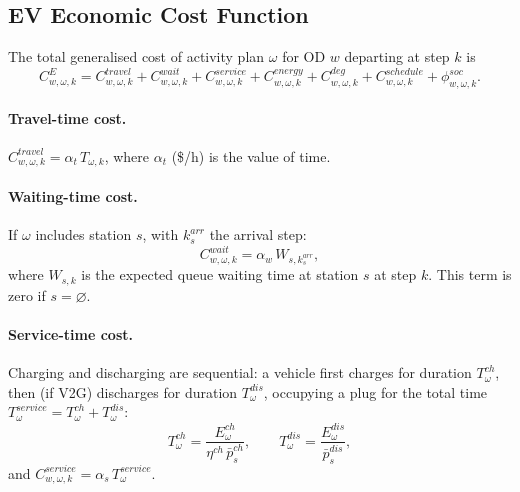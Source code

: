 \subsection{EV Economic Cost Function}
\label{sec:traffic-ev-cost}

The total generalised cost of activity plan $\omega$ for OD $w$ departing
at step $k$ is
\begin{equation}
  C^E_{w,\omega,k}
  = C^{travel}_{w,\omega,k}
  + C^{wait}_{w,\omega,k}
  + C^{service}_{w,\omega,k}
  + C^{energy}_{w,\omega,k}
  + C^{deg}_{w,\omega,k}
  + C^{schedule}_{w,\omega,k}
  + \phi^{soc}_{w,\omega,k}.
  \label{eq:ev-gencost}
\end{equation}

\paragraph{Travel-time cost.}
$C^{travel}_{w,\omega,k} = \alpha_t\, T_{\omega,k}$, where $\alpha_t$
(\$/h) is the value of time.

\paragraph{Waiting-time cost.}
If $\omega$ includes station $s$, with $k^{arr}_s$ the arrival step:
\begin{equation}
  C^{wait}_{w,\omega,k} = \alpha_w\, W_{s,k^{arr}_s},
  \label{eq:ev-wait-cost}
\end{equation}
where $W_{s,k}$ is the expected queue waiting time at station $s$ at
step $k$.  This term is zero if $s = \varnothing$.

\paragraph{Service-time cost.}
Charging and discharging are sequential: a vehicle first charges for
duration $T^{ch}_\omega$, then (if V2G) discharges for duration
$T^{dis}_\omega$, occupying a plug for the total time
$T^{service}_\omega = T^{ch}_\omega + T^{dis}_\omega$:
\begin{equation}
  T^{ch}_\omega  = \frac{E^{ch}_\omega}{\eta^{ch}\,\bar{p}^{ch}_s},
  \qquad
  T^{dis}_\omega = \frac{E^{dis}_\omega}{\bar{p}^{dis}_s},
  \label{eq:service-time}
\end{equation}
and $C^{service}_{w,\omega,k} = \alpha_s\, T^{service}_\omega$.

